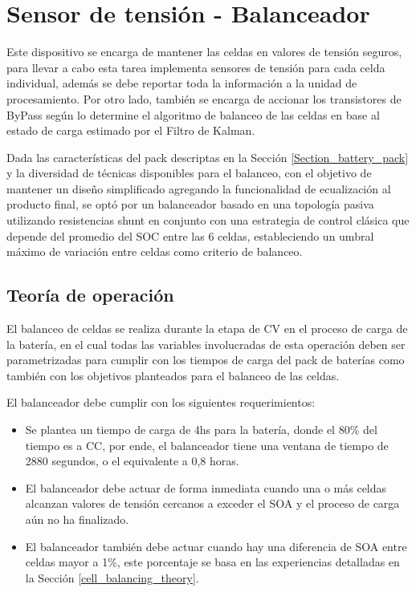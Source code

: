 \documentclass[10pt, a4paper]{report}
\begin{document}
\section{Sensor de tensi\'on - Balanceador}

Este dispositivo se encarga de mantener las celdas en valores de tensión seguros, para llevar a cabo esta tarea implementa sensores de tensión para cada celda individual, además se debe reportar toda la información a la unidad de procesamiento.
Por otro lado, también se encarga de accionar los transistores de ByPass según lo determine el algoritmo de balanceo de las celdas en base al estado de carga estimado por el Filtro de Kalman.

Dada las caracter\'isticas del pack descriptas en la Secci\'on \ref{Section_battery_pack} 
y la diversidad de t\'ecnicas disponibles para el balanceo, con el objetivo de
mantener un diseño simplificado agregando la funcionalidad de ecualizaci\'on al
producto final, se opt\'o por un balanceador basado en una topolog\'ia pasiva 
utilizando resistencias shunt en conjunto con una estrategia de control
cl\'asica que depende del promedio del \acrshort{SOC} entre las 6 celdas,
estableciendo un umbral m\'aximo de variaci\'on entre celdas como criterio de
balanceo. 


\subsection{Teor\'ia de operaci\'on}\label{seq:bal_theory}

El balanceo de celdas se realiza durante la etapa de \acrshort{CV} en el proceso
de carga de la bater\'ia, en el cual todas las variables involucradas de esta
operaci\'on deben ser parametrizadas para cumplir con los tiempos de carga del
pack de bater\'ias como tambi\'en con los objetivos planteados para el balanceo de
las celdas.

El balanceador debe cumplir con los siguientes requerimientos:

\begin{itemize}
    \item Se plantea un tiempo de carga de 4hs para la bater\'ia, donde el 80\%
        del tiempo es a \acrshort{CC}, por ende, el balanceador tiene una
       ventana de tiempo de 2880 segundos, o el equivalente a 0,8 horas.
    \item El balanceador debe actuar de forma inmediata cuando una o m\'as
        celdas alcanzan valores de tensi\'on cercanos a exceder el 
        \acrshort{SOA} y el proceso de carga a\'un no ha finalizado.
    \item El balanceador tambi\'en debe actuar cuando hay una diferencia de
        \acrshort{SOA} entre celdas mayor a 1\%, este porcentaje se basa en las
        experiencias detalladas en la Secci\'on \ref{cell_balancing_theory}.
\end{itemize}
\end{document}
